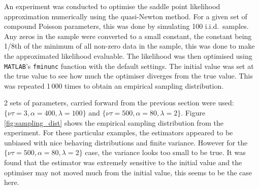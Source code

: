 \documentclass[a4paper]{proc}
\begin{document}
An experiment was conducted to optimise the saddle point likelihood approximation numerically using the quasi-Newton method. For a given set of compound Poisson parameters, this was done by simulating 100 i.i.d.~samples. Any zeros in the sample were converted to a small constant, the constant being 1/8th of the minimum of all non-zero data in the sample, this was done to make the approximated likelihood evaluable. The likelihood was then optimised using \texttt{MATLAB}'s \texttt{fminunc} function with the default settings. The initial value was set at the true value to see how much the optimiser diverges from the true value. This was repeated 1\,000 times to obtain an empirical sampling distribution.

2 sets of parameters, carried forward from the previous section were used: $\{\nu\tau=3,\alpha=400,\lambda=100\}$ and $\{\nu\tau=500,\alpha=80,\lambda=2\}$. Figure \ref{fig:sampling_dist} shows the empirical sampling distribution from the experiment. For these particular examples, the estimators appeared to be unbiased with nice behaving distributions and finite variance. However for the $\{\nu\tau=500,\alpha=80,\lambda=2\}$ case, the variance looks too small to be true. It was found that the estimator was extremely sensitive to the initial value and the optimiser may not moved much from the initial value, this seems to be the case here.
\end{document}
